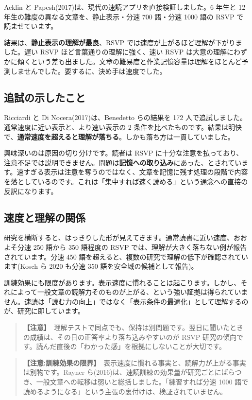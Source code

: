 \documentclass{article}
\begin{document}
Acklin と Papesh(2017)は、現代の速読アプリを直接検証しました。6 年生と 12 年生の難度の異なる文章を、静止表示・分速 700 語・分速 1000 語の RSVP で読ませています。

結果は、\textbf{静止表示の理解が最良}、RSVP では速度が上がるほど理解が下がりました。遅い RSVP ほど言葉通りの理解に強く、速い RSVP は大意の理解にわずかに傾くという差も出ました。文章の難易度と作業記憶容量は理解をほとんど予測しませんでした。要するに、決め手は速度でした。

\subsection{追試の示したこと}

Ricciardi と Di Nocera(2017)は、Benedetto らの結果を 172 人で追試しました。通常速度に近い表示と、より速い表示の 2 条件を比べたものです。結果は明快で、\textbf{通常速度を超えると理解が落ちる}。しかも落ち方は一貫していました。

興味深いのは原因の切り分けです。読者は RSVP に十分な注意を払っており、注意不足では説明できません。問題は\textbf{記憶への取り込み}にあった、とされています。速すぎる表示は注意を奪うのではなく、文章を記憶に残す処理の段階で内容を落としているのです。これは「集中すれば速く読める」という通念への直接の反訳になります。

\subsection{速度と理解の関係}

研究を横断すると、はっきりした形が見えてきます。通常読書に近い速度、おおよそ分速 250 語から 350 語程度の RSVP では、理解が大きく落ちない例が報告されています。分速 450 語を超えると、複数の研究で理解の低下が確認されています(Kosch ら 2020 も分速 350 語を安全域の候補として報告)。

訓練効果にも限度があります。表示速度に慣れることは起こります。しかし、それによって一般文章の読解力そのものが上がる、という強い証拠は得られていません。速読は「読む力の向上」ではなく「表示条件の最適化」として理解するのが、研究に即しています。

\begin{quote}
\textbf{【注意】}\ 理解テストで同点でも、保持は別問題です。翌日に聞いたときの成績は、その日の正答率より落ち込みやすいのが RSVP 研究の傾向です。読んだ直後の「わかった感」を根拠にしないことが大切です。
\end{quote}

\begin{quote}
\textbf{【注意:訓練効果の限界】}\ 表示速度に慣れる事実と、読解力が上がる事実は別物です。Rayner ら(2016)は、速読訓練の効果量が研究ごとにばらつき、一般文章への転移は弱いと総括しました。「練習すれば分速 1000 語で読めるようになる」という主張の裏付けは、検証されていません。
\end{quote}
\end{document}

